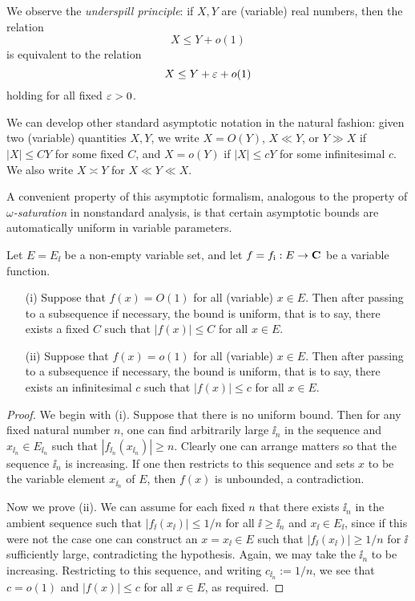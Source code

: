 We observe the \emph{underspill principle}: if $X,Y$ are (variable) real numbers, then the relation
$$ X \leq Y + o(1)$$
is equivalent to the relation
$$ X \leq Y + \varepsilon + o(1)$$
holding for all fixed $\varepsilon>0$.

We can develop other standard asymptotic notation in the natural fashion: given two (variable) quantities $X,Y$, we write $X = O(Y)$, $X \ll Y$, or $Y \gg X$ if $|X| \leq CY$ for some fixed $C$, and $X = o(Y)$ if $|X| \leq cY$ for some infinitesimal $c$.  We also write $X \asymp Y$ for $X \ll Y \ll X$.

A convenient property of this asymptotic formalism, analogous to the property of \emph{$\omega$-saturation} in nonstandard analysis, is that certain asymptotic bounds are automatically uniform in variable parameters.

\begin{proposition}\label{auto}  Let $E = E_{\ii}$ be a non-empty variable set, and let $f = f_{{\mathrm{i}}}: E \to \mathbf{C}$ be a variable function.  \begin{itemize}
    \item[(i)] Suppose that $f(x)=O(1)$ for all (variable) $x \in E$.  Then after passing to a subsequence if necessary, the bound is uniform, that is to say, there exists a fixed $C$ such that $|f(x)| \leq C$ for all $x \in E$.
    \item[(ii)] Suppose that $f(x)=o(1)$ for all (variable) $x \in E$.  Then after passing to a subsequence if necessary, the bound is uniform, that is to say, there exists an infinitesimal $c$ such that $|f(x)| \leq c$ for all $x \in E$.
\end{itemize}
\end{proposition}

\begin{proof} We begin with (i).  Suppose that there is no uniform bound.  Then for any fixed natural number $n$, one can find arbitrarily large $\ii_n$ in the sequence and $x_{\ii_n} \in E_{\ii_n}$ such that $|f_{\ii_n}(x_{\ii_n})| \geq n$.  Clearly one can arrange matters so that the sequence $\ii_n$ is increasing.  If one then restricts to this sequence and sets $x$ to be the variable element $x_{\ii_n}$ of $E$, then $f(x)$ is unbounded, a contradiction.

Now we prove (ii).  We can assume for each fixed $n$ that there exists $\ii_n$ in the ambient sequence such that $|f_{\ii}(x_{\ii})| \leq 1/n$ for all $\ii \geq \ii_n$ and $x_{\ii} \in E_{\ii}$, since if this were not the case one can construct an $x = x_{\ii} \in E$ such that $|f_{\ii}(x_{\ii})| \geq 1/n$ for $\ii$ sufficiently large, contradicting the hypothesis.  Again, we may take the $\ii_n$ to be increasing.  Restricting to this sequence, and writing $c_{\ii_n} := 1/n$, we see that $c=o(1)$ and $|f(x)| \leq c$ for all $x \in E$, as required.
\end{proof}

